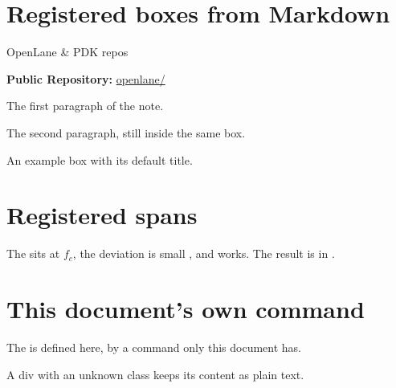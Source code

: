 

\section{Registered boxes from Markdown}
\label{sec:registered_boxes_from_markdown}

\begin{repocard}{OpenLane \& PDK repos}

\textbf{Public Repository:} \href{https://github.com/The-OpenROAD-Project/OpenLane}{openlane/}

\end{repocard}

\begin{notebox}

The first paragraph of the note.

The second paragraph, still inside the same box.

\end{notebox}

\begin{examplebox}

An example box with its default title.

\end{examplebox}

\section{Registered spans}
\label{sec:registered_spans}

The  sits at $f_c$, the deviation is small , and  works. The result is in .

\section{This document's own command}
\label{sec:this_documents_own_command}

The  is defined here, by a command only this document has.

A div with an unknown class keeps its content as plain text.
